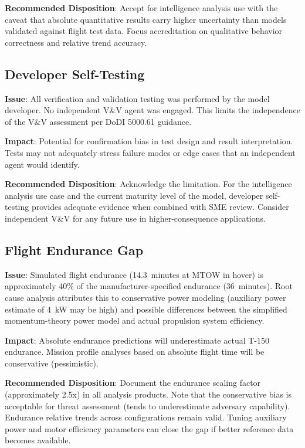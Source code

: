\documentclass[11pt, letterpaper]{article}
\begin{document}
\unclass \textbf{Recommended Disposition}: Accept for intelligence analysis use with the caveat that absolute quantitative results carry higher uncertainty than models validated against flight test data. Focus accreditation on qualitative behavior correctness and relative trend accuracy.

\subsection{\unclass Developer Self-Testing}

\unclass \textbf{Issue}: All verification and validation testing was performed by the model developer. No independent V\&V agent was engaged. This limits the independence of the V\&V assessment per DoDI 5000.61 guidance.

\unclass \textbf{Impact}: Potential for confirmation bias in test design and result interpretation. Tests may not adequately stress failure modes or edge cases that an independent agent would identify.

\unclass \textbf{Recommended Disposition}: Acknowledge the limitation. For the intelligence analysis use case and the current maturity level of the model, developer self-testing provides adequate evidence when combined with SME review. Consider independent V\&V for any future use in higher-consequence applications.

\subsection{\unclass Flight Endurance Gap}

\unclass \textbf{Issue}: Simulated flight endurance (14.3~minutes at MTOW in hover) is approximately 40\% of the manufacturer-specified endurance (36~minutes). Root cause analysis attributes this to conservative power modeling (auxiliary power estimate of 4~kW may be high) and possible differences between the simplified momentum-theory power model and actual propulsion system efficiency.

\unclass \textbf{Impact}: Absolute endurance predictions will underestimate actual T-150 endurance. Mission profile analyses based on absolute flight time will be conservative (pessimistic).

\unclass \textbf{Recommended Disposition}: Document the endurance scaling factor (approximately 2.5x) in all analysis products. Note that the conservative bias is acceptable for threat assessment (tends to underestimate adversary capability). Endurance relative trends across configurations remain valid. Tuning auxiliary power and motor efficiency parameters can close the gap if better reference data becomes available.
\end{document}
